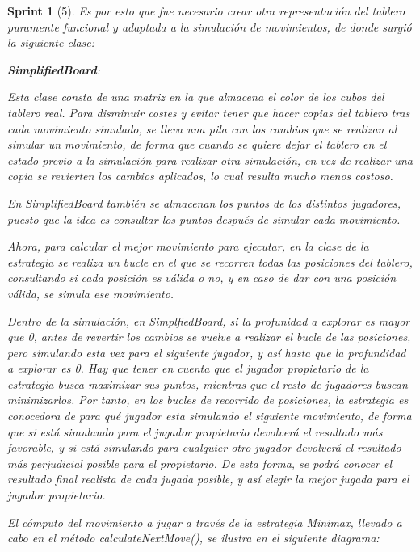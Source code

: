 \documentclass{article}
\theoremstyle{break}
\newtheorem*{sprint}{Sprint}
\begin{document}
\begin{sprint}[5]
Es por esto que fue necesario crear otra representación del tablero puramente funcional y adaptada a la simulación de movimientos, de donde surgió la siguiente clase:

\textbf{SimplifiedBoard}:

Esta clase consta de una matriz en la que almacena el color de los cubos del tablero real. Para disminuir costes y evitar tener que hacer copias del tablero tras cada movimiento simulado, se lleva una pila con los cambios que se realizan al simular un movimiento, de forma que cuando se quiere dejar el tablero en el estado previo a la simulación para realizar otra simulación, en vez de realizar una copia se revierten los cambios aplicados, lo cual resulta mucho menos costoso.

En SimplifiedBoard también se almacenan los puntos de los distintos jugadores, puesto que la idea es consultar los puntos después de simular cada movimiento.

Ahora, para calcular el mejor movimiento para ejecutar, en la clase de la estrategia se realiza un bucle en el que se recorren todas las posiciones del tablero, consultando si cada posición es válida o no, y en caso de dar con una posición válida, se simula ese movimiento.

Dentro de la simulación, en SimplfiedBoard, si la profunidad a explorar es mayor que 0, antes de revertir los cambios se vuelve a realizar el bucle de las posiciones, pero simulando esta vez para el siguiente jugador, y así hasta que la profundidad a explorar es 0. Hay que tener en cuenta que el jugador propietario de la estrategia busca maximizar sus puntos, mientras que el resto de jugadores buscan minimizarlos. Por tanto, en los bucles de recorrido de posiciones, la estrategia es conocedora de para qué jugador esta simulando el siguiente movimiento, de forma que si está simulando para el jugador propietario devolverá el resultado más favorable, y si está simulando para cualquier otro jugador devolverá el resultado más perjudicial posible para el propietario. De esta forma, se podrá conocer el resultado final realista de cada jugada posible, y así elegir la mejor jugada para el jugador propietario.

El cómputo del movimiento a jugar a través de la estrategia Minimax, llevado a cabo en el método calculateNextMove(), se ilustra en el siguiente diagrama:


\end{sprint}
\end{document}
